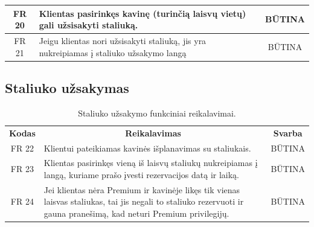 \documentclass{VUMIFPSkursinis}
\begin{document}
{{{{{\begin{center}
\begin{table}[H]
\begin{tabular}{|p{2cm}|p{}|p{}|}
	\hline
	
		\multicolumn{1}{|c|}{FR 20}&
		{Klientas pasirinkęs kavinę (turinčią laisvų vietų) gali užsisakyti staliuką.}&
		\multicolumn{1}{|c|}{BŪTINA}\\
	\hline
	
		\multicolumn{1}{|c|}{FR 21}&
		{Jeigu klientas nori užsisakyti staliuką, jis yra nukreipiamas į staliuko užsakymo langą}&
		\multicolumn{1}{|c|}{BŪTINA}\\				
	\hline
	
	\end{tabular}		
	
	\label{table:KavinėsPasirinkimas}
	\end{table}


\end{center}

\pagebreak


\subsection{Staliuko užsakymas}
\begin{center}
	\begin{table}[H]
	\caption{Staliuko užsakymo funkciniai reikalavimai.}
	\begin{tabular}{|p{2cm}|p{}|p{}|}
	
	\hline
	    \rowcolor{lightgray}
		\multicolumn{3}{|c|}{Staliuko užsakymas}\\
		
	\hline
		\multicolumn{1}{|c|}{{\bfseries Kodas}}&
		\multicolumn{1}{|c|}{{\bfseries Reikalavimas}}&
		\multicolumn{1}{|c|}{{\bfseries Svarba}}\\

	\hline
	
		\multicolumn{1}{|c|}{FR 22}&
		{Klientui pateikiamas kavinės išplanavimas su staliukais.}&
		\multicolumn{1}{|c|}{BŪTINA}\\				
	\hline
	
		\multicolumn{1}{|c|}{FR 23}&
		{Klientas pasirinkęs vieną iš laisvų staliukų nukreipiamas į langą, kuriame prašo įvesti rezervacijos datą ir laiką.}&
		\multicolumn{1}{|c|}{BŪTINA}\\				
	\hline
	
		\multicolumn{1}{|c|}{FR 24}&
		{Jei klientas nėra Premium ir kavinėje likęs tik vienas laisvas staliukas, tai jis negali to staliuko rezervuoti ir gauna pranešimą, kad neturi Premium privilegijų.}&
		\multicolumn{1}{|c|}{BŪTINA}\\				
	\hline
	

\end{tabular}
\end{table}
\end{center}}}}}}
\end{document}
